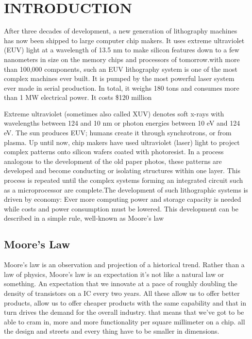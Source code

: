 \documentclass[12pt,a4paper]{report}
\begin{document}
\tableofcontents %
\listoffigures




    

\chapter{INTRODUCTION}
After three decades of development, a new generation of 
lithography machines has now been shipped to large 
computer chip makers. It uses extreme ultraviolet (EUV) 
light at a wavelength of 13.5 nm to make silicon 
features down to a few nanometers in size on the 
memory chips and processors of tomorrow.with more than 
100,000 components, such an EUV 
lithography system is one of the most complex 
machines ever built. It is pumped by the most 
powerful laser system ever made in serial production. 
In total, it weighs 180 tons and consumes more than 
1 MW electrical power. It costs \$120 million

Extreme ultraviolet (sometimes also called XUV) denotes 
soft x-rays with wavelengths between 124 and 10 nm or
 photon energies between 10 eV and 124 eV. 
 The sun produces EUV; humans create it through 
 synchrotrons, or from plasma.
Up until now, chip makers have used ultraviolet 
(laser) light to project complex patterns onto
 silicon wafers coated with photoresist. In a process 
 analogous to the development of the old paper photos, 
 these patterns are developed and become conducting or 
 isolating structures within one layer. This process is 
 repeated until the complex systems forming an 
 integrated circuit such as a microprocessor are 
 complete.The development of such lithographic systems is 
driven by economy: Ever more computing power 
and storage capacity is needed while costs and 
power consumption must be lowered. 
This development can be described in a simple rule, 
well-known as Moore’s law

\section{Moore's Law}
Moore's law is an observation and projection of a 
historical trend. Rather than a law 
of physics, Moore's law is an expectation it's 
not like a natural law or something. An expectation 
that we innovate at a pace of roughly doubling 
the density of transistors on a IC every two years.
All these allow us to 
offer better products, allow us to offer cheaper 
products with the same capability and that in 
turn drives the demand for the overall industry. 
that means that we've got to be able to cram in, 
more and more
functionality per square millimeter on a chip. all 
the design and streets and every thing have to be 
smaller in dimensions.
\end{document}

